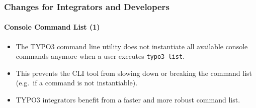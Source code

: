 %

\begin{frame}[fragile]
	\frametitle{Changes for Integrators and Developers}
	\framesubtitle{Console Command List (1)}

	\begin{itemize}
		\item The TYPO3 command line utility does not instantiate all available
			console commands anymore when a user executes \texttt{typo3 list}.
		\item This prevents the CLI tool from slowing down or breaking the
			command list (e.g.\ if a command is not instantiable).
		\item TYPO3 integrators benefit from a faster and more robust command list.
	\end{itemize}

\end{frame}

